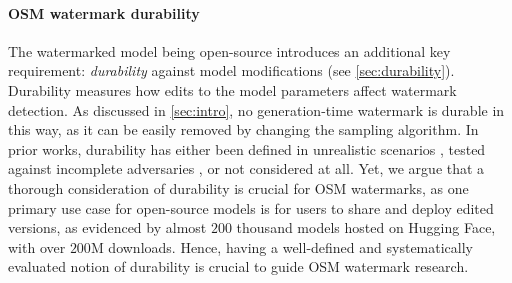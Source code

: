 \paragraph{OSM watermark durability}
The watermarked model being open-source introduces an additional key requirement: \emph{durability} against model modifications (see \cref{sec:durability}).
Durability measures how edits to the model parameters affect watermark detection.
As discussed in \cref{sec:intro}, no generation-time watermark is durable in this way, as it can be easily removed by changing the sampling algorithm.
In prior works, durability has either been defined in unrealistic scenarios \citep{unremovable}, tested against incomplete adversaries \citep{learnability}, or not considered at all.
Yet, we argue that a thorough consideration of durability is crucial for OSM watermarks, as one primary use case for open-source models is for users to share and deploy edited versions, as evidenced by almost $200$ thousand models hosted on Hugging Face, with over $200$M downloads.
Hence, having a well-defined and systematically evaluated notion of durability is crucial to guide OSM watermark research.
